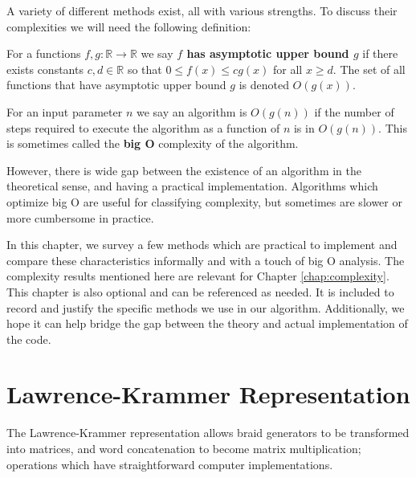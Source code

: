 \documentclass[12pt]{thesis}
\begin{document}
A variety of different methods exist, all with various strengths.
To discuss their complexities we will need the following definition:
\begin{definition}
    \cite{clrs}
    For a functions $f, g \colon \mathbb{R} \rightarrow \mathbb{R}$ 
    we say \textbf{$f$ has asymptotic upper bound $g$} if
    there exists constants $c, d \in \mathbb{R}$
    so that $0 \leq f(x) \leq cg(x)$ for all $x \geq d$.
    The set of all functions that have asymptotic upper bound $g$
    is denoted $O(g(x))$.
\end{definition}
\begin{definition}
    For an input parameter $n$
    we say an algorithm is $O(g(n))$
    if the number of steps required to execute
    the algorithm as a function of $n$ is in $O(g(n))$.
    This is sometimes called the \textbf{big O} complexity
    of the algorithm.
\end{definition}
However, there is wide gap between the existence of an algorithm
in the theoretical sense, and having a practical implementation.
Algorithms which optimize big O are useful for classifying complexity,
but sometimes are slower or more cumbersome in practice. 

In this chapter, we survey a few methods which are practical to implement
and compare these characteristics informally and with a touch of big O analysis.
The complexity results mentioned here are relevant for Chapter \ref{chap:complexity}.
This chapter is also optional and can be referenced as needed.
It is included to record and justify the specific methods we use in our algorithm.
Additionally, we hope it can help bridge the gap between the theory 
and actual implementation of the code. 

\section{Lawrence-Krammer Representation}

The Lawrence-Krammer representation allows braid
generators to be transformed into matrices,
and word concatenation to become matrix multiplication;
operations which have straightforward computer implementations.
\end{document}
